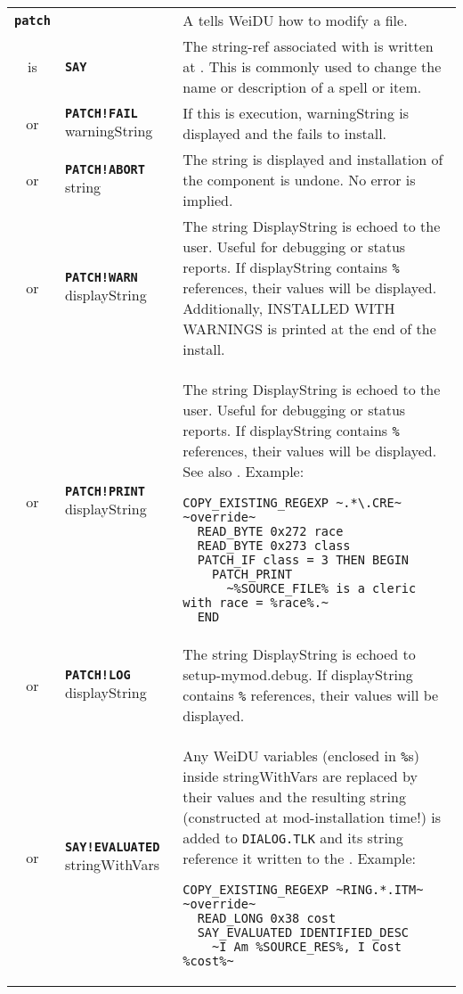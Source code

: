 \documentclass{article}
\def\ttref#1{\ahrefloc{#1}{\tt #1}}
\def\DEFINE#1{{\tt \bf #1}\label{#1}\index{#1}}
\def\DEFSYN#1{{\tt \bf #1}\index{#1}}
\def\t#1{{\tt #1}}
\begin{document}
\begin{tabular}{cp{10in}|p{10in}}
\DEFINE{patch} & & A \ttref{patch} tells WeiDU how to modify a file.  \\
is & \DEFSYN{SAY} \ttref{offset} \ttref{String} &
  The string-ref associated with \ttref{String} is written at
  \ttref{offset}. This is commonly used to change the name or
  description of a spell or item. \\
  or & \DEFINE{PATCH!FAIL} warningString &
    If this \ttref{TP2 Action} is execution, warningString is displayed and
    the \ttref{component} fails to install. \\
  or & \DEFINE{PATCH!ABORT} string &
    The string is displayed and installation of the component is undone.
    No error is implied. \\
  or & \DEFINE{PATCH!WARN} displayString &
    The string DisplayString is echoed to the user. Useful for debugging or
    status reports. If displayString contains \t{\%}\ttref{variable}\t{\%}
    references, their values will be displayed. Additionally, INSTALLED WITH
    WARNINGS is printed at the end of the install.
    \\
  or & \DEFINE{PATCH!PRINT} displayString &
  The string DisplayString is echoed to the user. Useful for debugging or
  status reports. If displayString contains \t{\%}\ttref{variable}\t{\%}
  references, their values will be displayed. See also \ttref{PRINT}.
  Example:
\begin{verbatim}
COPY_EXISTING_REGEXP ~.*\.CRE~ ~override~
  READ_BYTE 0x272 race
  READ_BYTE 0x273 class
  PATCH_IF class = 3 THEN BEGIN
    PATCH_PRINT
      ~%SOURCE_FILE% is a cleric with race = %race%.~
  END
\end{verbatim} \\
  or & \DEFINE{PATCH!LOG} displayString &
    The string DisplayString is echoed to setup-mymod.debug.
    If displayString contains \t{\%}\ttref{variable}\t{\%}
    references, their values will be displayed. \\
or & \DEFINE{SAY!EVALUATED} \ttref{offset} stringWithVars &
  Any WeiDU variables (enclosed in \t{\%}s) inside stringWithVars are
  replaced by their values and the resulting string (constructed at
  mod-installation time!) is added to \t{DIALOG.TLK} and its string
  reference it written to the \ttref{offset}. Example:
\begin{verbatim}
COPY_EXISTING_REGEXP ~RING.*.ITM~ ~override~
  READ_LONG 0x38 cost
  SAY_EVALUATED IDENTIFIED_DESC
    ~I Am %SOURCE_RES%, I Cost %cost%~
\end{verbatim} \\

\end{tabular}
\end{document}
